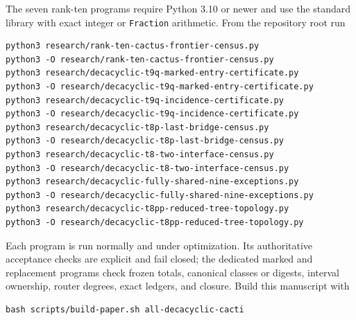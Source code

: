 \documentclass[11pt]{article}
\begin{document}
The seven rank-ten programs require Python 3.10 or newer and use the standard
library with exact integer or \texttt{Fraction} arithmetic.  From the
repository root run
\begin{verbatim}
python3 research/rank-ten-cactus-frontier-census.py
python3 -O research/rank-ten-cactus-frontier-census.py
python3 research/decacyclic-t9q-marked-entry-certificate.py
python3 -O research/decacyclic-t9q-marked-entry-certificate.py
python3 research/decacyclic-t9q-incidence-certificate.py
python3 -O research/decacyclic-t9q-incidence-certificate.py
python3 research/decacyclic-t8p-last-bridge-census.py
python3 -O research/decacyclic-t8p-last-bridge-census.py
python3 research/decacyclic-t8-two-interface-census.py
python3 -O research/decacyclic-t8-two-interface-census.py
python3 research/decacyclic-fully-shared-nine-exceptions.py
python3 -O research/decacyclic-fully-shared-nine-exceptions.py
python3 research/decacyclic-t8pp-reduced-tree-topology.py
python3 -O research/decacyclic-t8pp-reduced-tree-topology.py
\end{verbatim}
Each program is run normally and under optimization.  Its authoritative
acceptance checks are explicit and fail closed; the dedicated marked and
replacement programs check frozen totals, canonical classes or digests,
interval ownership, router degrees, exact ledgers, and closure.  Build this
manuscript with
\begin{verbatim}
bash scripts/build-paper.sh all-decacyclic-cacti
\end{verbatim}
\end{document}
